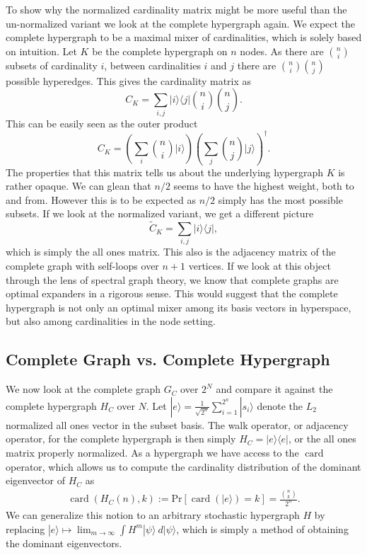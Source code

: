 \documentclass{article}
\newcommand{\ket}[1]{|#1\rangle}
\newcommand{\ketbra}[2]{| #1\rangle\! \langle #2|}
\newcommand{\parens}[1]{\left( #1 \right)}
\newcommand{\prob}[1]{\text{Pr}\left[ #1 \right]}
\DeclareMathOperator{\card}{card}
\newcommand{\cardi}[1]{\card \parens{ #1 }}
\begin{document}
To show why the normalized cardinality matrix might be more useful than the un-normalized variant we look at the complete hypergraph again. We expect the complete hypergraph to be a maximal mixer of cardinalities, which is solely based on intuition. Let $K$ be the complete hypergraph on $n$ nodes. As there are $\binom{n}{i}$ subsets of cardinality $i$, between cardinalities $i$ and $j$ there are $\binom{n}{i} \binom{n}{j}$ possible hyperedges. This gives the cardinality matrix as
\begin{equation}
    C_K = \sum_{i,j} \ketbra{i}{j} \binom{n}{i} \binom{n}{j}.
\end{equation}
This can be easily seen as the outer product
\begin{equation}
    C_K = \parens{\sum_{i} \binom{n}{i} \ket{i}} \parens{\sum_{j} \binom{n}{j} \ket{j}}^\dagger.
\end{equation}
The properties that this matrix tells us about the underlying hypergraph $K$ is rather opaque. We can glean that $n/2$ seems to have the highest weight, both to and from. However this is to be expected as $n/2$ simply has the most possible subsets. If we look at the normalized variant, we get a different picture
\begin{equation}
    \widetilde{C}_K = \sum_{i,j} \ketbra{i}{j},
\end{equation}
which is simply the all ones matrix. This also is the adjacency matrix of the complete graph with self-loops over $n+1$ vertices. If we look at this object through the lens of spectral graph theory, we know that complete graphs are optimal expanders in a rigorous sense. This would suggest that the complete hypergraph is not only an optimal mixer among its basis vectors in hyperspace, but also among cardinalities in the node setting.



\subsection{Complete Graph vs. Complete Hypergraph}
We now look at the complete graph $G_C$ over $2^N$ and compare it against the complete hypergraph $H_C$ over $N$. Let $\ket{e} = \frac{1}{\sqrt{2^n}} \sum_{i=1}^{2^n} \ket{s_i}$ denote the $L_2$ normalized all ones vector in the subset basis. The walk operator, or adjacency operator, for the complete hypergraph is then simply $H_C = \ketbra{e}{e}$, or the all ones matrix properly normalized. As a hypergraph we have access to the $\card$ operator, which allows us to compute the cardinality distribution of the dominant eigenvector of $H_C$ as
\begin{align}
    \cardi{H_C(n), k} := \prob{\cardi{\ket{e}} = k } = \frac{\binom{n}{k}}{2^n}.
\end{align}
We can generalize this notion to an arbitrary stochastic hypergraph $H$  by replacing $\ket{e} \mapsto \lim_{m \to \infty} \int H^m \ket{\psi} ~d\ket{\psi} $, which is simply a method of obtaining the dominant eigenvectors.
\end{document}
